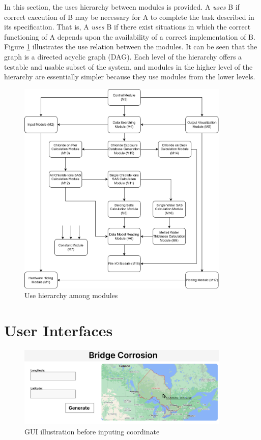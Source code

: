 \documentclass[12pt, titlepage]{article}
\begin{document}
In this section, the uses hierarchy between modules is
provided. A {\em uses} B if
correct execution of B may be necessary for A to complete the task described in
its specification. That is, A {\em uses} B if there exist situations in which
the correct functioning of A depends upon the availability of a correct
implementation of B.  Figure \ref{FigUH} illustrates the use relation between
the modules. It can be seen that the graph is a directed acyclic graph
(DAG). Each level of the hierarchy offers a testable and usable subset of the
system, and modules in the higher level of the hierarchy are essentially simpler
because they use modules from the lower levels.

\begin{figure}[H]
\centering
\includegraphics[width=0.9\textwidth]{UsesHierarchy.png}
\caption{Use hierarchy among modules}
\label{FigUH}
\end{figure}


\section{User Interfaces}

\begin{figure}[H]
\centering
\includegraphics[width=0.9\textwidth]{GUI1.png}
\caption{GUI illustration before inputing coordinate}
\label{FigGUI1}
\end{figure}
\end{document}
